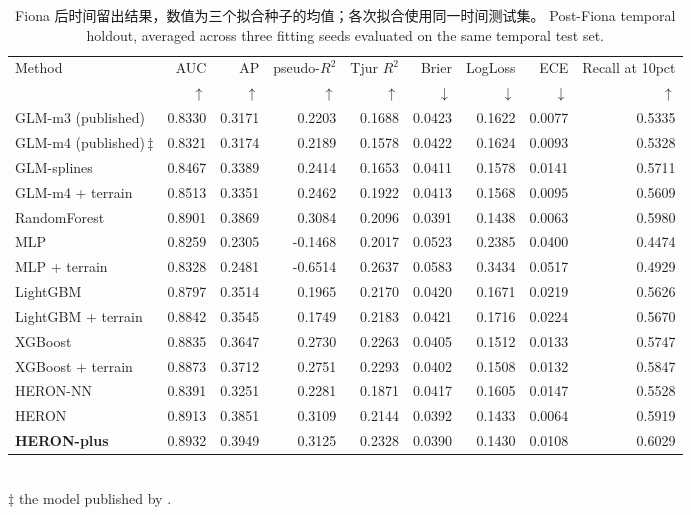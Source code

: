\begin{table}[htbp]\centering\footnotesize
\caption{\ifzh
Fiona 后时间留出结果，数值为三个拟合种子的均值；各次拟合使用同一时间测试集。
\else
Post-Fiona temporal holdout, averaged across three fitting seeds evaluated on the same temporal test set.
\fi}\label{tab:bench_temporal}
\begin{adjustbox}{max width=\linewidth}
\begin{tabular}{lrrrrrrrr}\toprule
Method & AUC & AP & pseudo-$R^2$ & Tjur $R^2$ & Brier & LogLoss & ECE & Recall at 10pct \\
& $\uparrow$ & $\uparrow$ & $\uparrow$ & $\uparrow$ & $\downarrow$ & $\downarrow$ & $\downarrow$ & $\uparrow$ \\ \midrule
GLM-m3 (published) & 0.8330 & 0.3171 & 0.2203 & 0.1688 & 0.0423 & 0.1622 & 0.0077 & 0.5335 \\
GLM-m4 (published)\,$\ddagger$ & 0.8321 & 0.3174 & 0.2189 & 0.1578 & 0.0422 & 0.1624 & 0.0093 & 0.5328 \\
GLM-splines & 0.8467 & 0.3389 & 0.2414 & 0.1653 & 0.0411 & 0.1578 & 0.0141 & 0.5711 \\
GLM-m4 + terrain & 0.8513 & 0.3351 & 0.2462 & 0.1922 & 0.0413 & 0.1568 & 0.0095 & 0.5609 \\
RandomForest & 0.8901 & 0.3869 & 0.3084 & 0.2096 & 0.0391 & 0.1438 & 0.0063 & 0.5980 \\
MLP & 0.8259 & 0.2305 & -0.1468 & 0.2017 & 0.0523 & 0.2385 & 0.0400 & 0.4474 \\
MLP + terrain & 0.8328 & 0.2481 & -0.6514 & 0.2637 & 0.0583 & 0.3434 & 0.0517 & 0.4929 \\
LightGBM & 0.8797 & 0.3514 & 0.1965 & 0.2170 & 0.0420 & 0.1671 & 0.0219 & 0.5626 \\
LightGBM + terrain & 0.8842 & 0.3545 & 0.1749 & 0.2183 & 0.0421 & 0.1716 & 0.0224 & 0.5670 \\
XGBoost & 0.8835 & 0.3647 & 0.2730 & 0.2263 & 0.0405 & 0.1512 & 0.0133 & 0.5747 \\
XGBoost + terrain & 0.8873 & 0.3712 & 0.2751 & 0.2293 & 0.0402 & 0.1508 & 0.0132 & 0.5847 \\
HERON-NN & 0.8391 & 0.3251 & 0.2281 & 0.1871 & 0.0417 & 0.1605 & 0.0147 & 0.5528 \\
HERON & 0.8913 & 0.3851 & 0.3109 & 0.2144 & 0.0392 & 0.1433 & 0.0064 & 0.5919 \\
\textbf{HERON-plus} & 0.8932 & 0.3949 & 0.3125 & 0.2328 & 0.0390 & 0.1430 & 0.0108 & 0.6029 \\
\bottomrule\end{tabular}
\end{adjustbox}
\\[2pt]\footnotesize $\ddagger$ the model published by \cite{ortiz2026}.
\end{table}